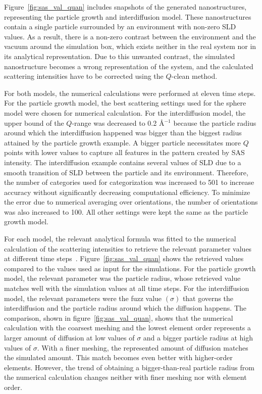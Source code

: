 \documentclass[preprint, 5p, times, twocolumn]{elsarticle}
\begin{document}
Figure~\ref{fig:sas_val_quan} includes snapshots of the generated nanostructures, representing the particle growth and interdiffusion model. These nanostructures contain a single particle surrounded by an environment with non-zero SLD values. As a result, there is a non-zero contrast between the environment and the vacuum around the simulation box, which exists neither in the real system nor in its analytical representation. Due to this unwanted contrast, the simulated nanostructure becomes a wrong representation of the system, and the calculated scattering intensities have to be corrected using the $Q$-clean method.

For both models, the numerical calculations were performed at eleven time steps. For the particle growth model, the best scattering settings used for the sphere model were chosen for numerical calculation. For the interdiffusion model, the upper bound of the $Q$-range was decreased to 0.2 \AA{$^{-1}$} because the particle radius around which the interdiffusion happened was bigger than the biggest radius attained by the particle growth example. A bigger particle necessitates more $Q$ points with lower values to capture all features in the pattern created by SAS intensity. The interdiffusion example contains several values of SLD due to a smooth transition of SLD between the particle and its environment. Therefore, the number of categories used for categorization was increased to 501 to increase accuracy without significantly decreasing computational efficiency. To minimize the error due to numerical averaging over orientations, the number of orientations was also increased to 100. All other settings were kept the same as the particle growth model.

For each model, the relevant analytical formula was fitted to the numerical calculation of the scattering intensities to retrieve the relevant parameter values at different time steps~\cite{2020SciPy-NMeth}. Figure~\ref{fig:sas_val_quan} shows the retrieved values compared to the values used as input for the simulations. For the particle growth model, the relevant parameter was the particle radius, whose retrieved value matches well with the simulation values at all time steps. For the interdiffusion model, the relevant parameters were the fuzz value $(\sigma)$ that governs the interdiffusion and the particle radius around which the diffusion happens. The comparison, shown in figure~\ref{fig:sas_val_quan}, shows that the numerical calculation with the coarsest meshing and the lowest element order represents a larger amount of diffusion at low values of $\sigma$ and a bigger particle radius at high values of $\sigma$. With a finer meshing, the represented amount of diffusion matches the simulated amount. This match becomes even better with higher-order elements. However, the trend of obtaining a bigger-than-real particle radius from the numerical calculation changes neither with finer meshing nor with element order. 
\end{document}
